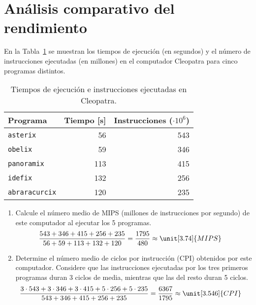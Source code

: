 \section{Análisis comparativo del
rendimiento}

\begin{ejercicio}\label{ej:4.1}
En la Tabla~\ref{tab:ej:4.1} se muestran los tiempos de ejecución (en segundos) y el número de instrucciones ejecutadas (en millones) en el computador Cleopatra para cinco programas distintos.
\begin{table}[h]
\centering
\begin{tabular}{@{}lrr@{}}
\toprule
Programa & Tiempo [s] & Instrucciones ($\cdot 10^6$) \\ \midrule
\verb|asterix| & 56 & 543 \\
\verb|obelix| & 59 & 346 \\
\verb|panoramix| & 113 & 415 \\
\verb|idefix| & 132 & 256 \\
\verb|abraracurcix| & 120 & 235 \\ \bottomrule
\end{tabular}
\caption{Tiempos de ejecución e instrucciones ejecutadas en Cleopatra.}
\label{tab:ej:4.1}
\end{table}
\begin{enumerate}
    \item Calcule el número medio de MIPS (millones de instrucciones por segundo) de este computador al ejecutar los 5 programas.
    \begin{align*}
        \dfrac{543 + 346 + 415 + 256 + 235}{56 + 59 + 113 + 132 + 120} &= \dfrac{1795}{480}\approx \unit[3.74]{MIPS}
    \end{align*}
    \item Determine el número medio de ciclos por instrucción (CPI) obtenidos por este computador. Considere que las instrucciones ejecutadas por los tres primeros programas duran 3 ciclos de media, mientras que las del resto duran 5 ciclos.
    \begin{align*}
        \dfrac{3 \cdot 543 + 3 \cdot 346 + 3 \cdot 415 + 5 \cdot 256 + 5 \cdot 235}{543 + 346 + 415 + 256 + 235} &= \dfrac{6367}{1795} \approx \unit[3.546]{CPI}
    \end{align*}
\end{enumerate}
\end{ejercicio}
\begin{comment}Sol:
1. El computador obtiene 3,74 MIPS.
2. El número medio de CPI es 3,55.
\end{comment}


